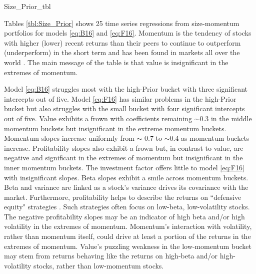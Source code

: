 
{Size_Prior_tbl}

Tables \ref{tbl:Size_Prior} shows 25
time series regressions from size-momentum portfolios for models
\ref{eq:B16} and \ref{eq:F16}.
Momentum is the tendency of stocks with higher (lower) recent returns than
their peers to continue to outperform (underperform) in the short term
\parencite{jegadeesh1993returns} and has been found in markets all over
the world \parencite{asness2013value}.
The main message of the table is that value is insignificant in the extremes
of momentum.

Model \ref{eq:B16} struggles most with the high-Prior bucket with three
significant intercepts out of five.
Model \ref{eq:F16} has similar problems in the high-Prior bucket but also
struggles with the small bucket with four significant intercepts out of five.
Value exhibits a frown with coefficients remaining $\sim$0.3 in the middle
momentum buckets but insignificant in the extreme momentum buckets.
Momentum slopes increase uniformly from $\sim$-0.7 to $\sim$0.4 as momentum
buckets increase.
Profitability slopes also exhibit a frown but, in contrast to value, are
negative and significant in the extremes of momentum but insignificant
in the inner momentum buckets.
The investment factor offers little to model \ref{eq:F16} with insignificant
slopes.
Beta slopes exhibit a smile across momentum buckets. Beta and variance are
linked as a stock's variance drives its covariance with the market.
Furthermore, profitability helps to describe the returns on ``defensive equity"
strategies \parencite{novy2014understanding}.
Such strategies often focus on low-beta, low-volatility stocks.
The negative profitability slopes may be an indicator of high beta and/or
high volatility in the extremes of momentum.
Momentum's interaction with volatility, rather than momentum itself, could
drive at least a portion of the returns in the extremes of momentum.
Value's puzzling weakness in the low-momentum bucket may stem from returns
behaving like the returns on high-beta and/or high-volatility stocks,
rather than low-momentum stocks.

